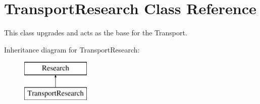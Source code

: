 \hypertarget{class_transport_research}{}\section{Transport\+Research Class Reference}
\label{class_transport_research}


This class upgrades and acts as the base for the Transport.  


Inheritance diagram for Transport\+Research\+:\begin{figure}[H]
\begin{center}
\leavevmode
\includegraphics[height=2.000000cm]{class_transport_research}
\end{center}
\end{figure}
